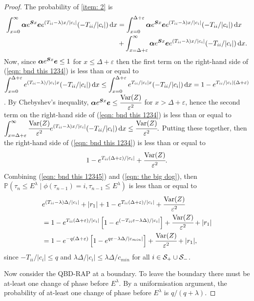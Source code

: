 \begin{proof}
	The probability of \ref{item: 2} is 
	\begin{align}
		\nonumber\int_{x=0}^\infty \boldsymbol \alpha e^{\boldsymbol{S}x}\boldsymbol e e^{(T_{ii}-\lambda)x/|c_i|}(-T_{ii}/|c_i|)\, \mathrm{d} x 
		&= \int_{x=0}^{\Delta+\varepsilon} \boldsymbol \alpha e^{\boldsymbol{S}x}\boldsymbol ee^{(T_{ii}-\lambda)x/|c_i|}(-T_{ii}/|c_i|)\, \mathrm{d} x 
		\\&{}+\int_{x=\Delta+\varepsilon}^\infty \boldsymbol \alpha e^{\boldsymbol{S}x}\boldsymbol e e^{(T_{ii}-\lambda)x/|c_i|}(-T_{ii}/|c_i|)\, \mathrm{d} x.\label{eqn: bnd this 1234}
	\end{align}
	Now, since \(\boldsymbol \alpha e^{\boldsymbol{S}x}\boldsymbol e\leq 1\) for \(x\leq \Delta+\varepsilon\) then the first term on the right-hand side of (\ref{eqn: bnd this 1234}) is less than or equal to \(\displaystyle \int_{x=0}^{\Delta+\varepsilon} e^{(T_{ii}-\lambda)/|c_i|x}(-T_{ii}/|c_i|)\, \mathrm{d} x \leq \int_{x=0}^{\Delta+\varepsilon} e^{T_{ii}/|c_i|x}(-T_{ii}/|c_i|)\, \mathrm{d} x = 1-e^{T_{ii}/|c_i|(\Delta+\varepsilon)}\). By Chebyshev's inequality, \(\boldsymbol \alpha e^{\boldsymbol{S}x}\boldsymbol e\leq \cfrac{\mathrm{Var}(Z)}{\varepsilon^2}\) for \(x> \Delta+\varepsilon\), hence the second term on the right-hand side of (\ref{eqn: bnd this 1234}) is less than or equal to \(\displaystyle \int_{x=\Delta+\varepsilon}^\infty \cfrac{\mathrm{Var}(Z)}{\varepsilon^2} e^{(T_{ii}-\lambda)x/|c_i|}(-T_{ii}/|c_i|)\, \mathrm{d} x \leq  \cfrac{\mathrm{Var}(Z)}{\varepsilon^2}.\) %
	Putting these together, then the right-hand side of (\ref{eqn: bnd this 1234}) is less than or equal to
	\begin{align}
		1-e^{T_{ii}(\Delta+\varepsilon)/|c_i|} + \cfrac{\mathrm{Var}(Z)}{\varepsilon^2}.\label{eqn: the big dog}
	\end{align}	
	Combining (\ref{eqn: bnd this 12345}) and (\ref{eqn: the big dog}), then \(\mathbb P(\tau_n\leq E^\lambda  \mid \phi(\tau_{n-1})=i , \tau_{n-1}\leq  E^\lambda)\) is less than or equal to 
	\begin{align}
		&e^{(T_{ii}-\lambda)\Delta/|c_i|} + |r_1| + 1-e^{T_{ii}(\Delta+\varepsilon)/|c_i|} + \cfrac{\mathrm{Var}(Z)}{\varepsilon^2}\nonumber
		\\&= 1-e^{T_{ii}(\Delta+\varepsilon)/|c_i|}\left[1-e^{(-T_{ii}\varepsilon-\lambda \Delta)/|c_i|}\right] + \cfrac{\mathrm{Var}(Z)}{\varepsilon^2} + |r_1|
		\\&= 1-e^{-q(\Delta+\varepsilon)}\left[1-e^{q\varepsilon-\lambda \Delta/|c_{min}|}\right] + \cfrac{\mathrm{Var}(Z)}{\varepsilon^2} + |r_1|,
	\end{align}
	since \(-T_{ii}/|c_i|\leq q\) and \(\lambda \Delta/|c_i| \leq \lambda \Delta/c_{min}\) for all \(i\in\mathcal S_+\cup \mathcal{S}_-\). 
	
	Now consider the QBD-RAP at a boundary. To leave the boundary there must be at-least one change of phase before \(E^\lambda\). By a uniformisation argument, the probability of at-least one change of phase before \(E^\lambda\) is \(q/(q+\lambda)\). 
\end{proof}
